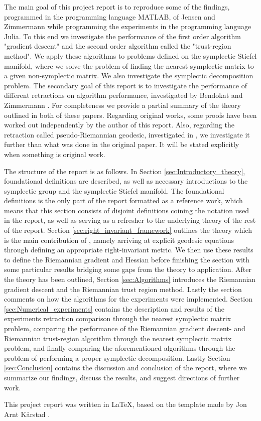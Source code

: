 The main goal of this project report is to reproduce some of the findings, programmed in the programming language MATLAB, of Jensen and Zimmermann \cite{JensenZimmermann2024} while programming the experiments in the programming language Julia. To this end we investigate the performance of the first order algorithm "gradient descent" and the second order algorithm called the "trust-region method". We apply these algorithms to problems defined on the symplectic Stiefel manifold, where we solve the problem of finding the nearest symplectic matrix to a given non-symplectic matrix. We also investigate the symplectic decomposition problem. The secondary goal of this report is to investigate the performance of different retractions on algorithm performance, investigated by Bendokat and Zimmermann \cite{BendokatZimmermann2021}. For completeness we provide a partial summary of the theory outlined in both of these papers. Regarding original works, some proofs have been worked out independently by the author of this report. Also, regarding the retraction called pseudo-Riemannian geodesic, investigated in \cite{BendokatZimmermann2021}, we investigate it further than what was done in the original paper. It will be stated explicitly when something is original work. 

The structure of the report is as follows. In Section \ref{sec:Introductory_theory}, foundational definitions are described, as well as necessary introductions to the symplectic group and the symplectic Stiefel manifold. The foundational definitions is the only part of the report formatted as a reference work, which means that this section consists of disjoint definitions coining the notation used in the report, as well as serving as a refresher to the underlying theory of the rest of the report. Section \ref{sec:right_invariant_framework} outlines the theory which is the main contribution of \cite{BendokatZimmermann2021}, namely arriving at explicit geodesic equations through defining an appropriate right-invariant metric. We then use these results to define the Riemannian gradient and Hessian before finishing the section with some particular results bridging some gaps from the theory to application. After the theory has been outlined, Section \ref{sec:Algorithms} introduces the Riemannian gradient descent and the Riemannian trust region method. Lastly the section comments on how the algorithms for the experiments were implemented. Section \ref{sec:Numerical_experiments} contains the description and results of the experiments retraction comparison through the nearest symplectic matrix problem, comparing the performance of the Riemannian gradient descent- and Riemannian trust-region algorithm through the nearest symplectic matrix problem, and finally comparing the aforementioned algorithms through the problem of performing a proper symplectic decomposition. Lastly Section \ref{sec:Conclusion} contains the discussion and conclusion of the report, where we summarize our findings, discuss the results, and suggest directions of further work.  

This project report was written in \LaTeX, based on the template made by Jon Arnt Kårstad \cite{Kårstad2024}.